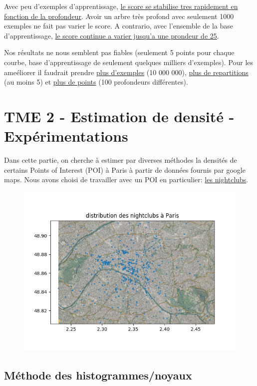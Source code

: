 \documentclass[a4paper]{article}
\begin{document}
Avec peu d'exemples d'apprentissage, \ul{le score se stabilise tres rapidement en fonction de la profondeur}. Avoir un arbre très profond avec seulement 1000 exemples ne fait pas varier le score. A contrario, avec l'ensemble de la base d'apprentissage, \ul{le score continue a varier jusqu'a une prondeur de 25}.

Nos résultats ne nous semblent pas fiables (seulement 5 points pour chaque courbe, base d'apprentissage de seulement quelques milliers d'exemples). Pour les ameéliorer il faudrait prendre \ul{plus d'exemples} (10 000 000), \ul{plus de repartitions} (au moins 5) et \ul{plus de points} (100 profondeurs différentes).



\section*{TME 2 - Estimation de densité - Expérimentations}

Dans cette partie, on cherche à estimer par diverses méthodes la densités de certains Points of Interest (POI) à Paris à partir de données fournis par google maps. Nous avons choisi de travailler avec un POI en particulier: \ul{les nightclubs}.

\begin{figure}[ht!]
\begin{center}
\includegraphics[scale=0.5]{nightclubs.png}
\label{apprentissage_prof2}
\end{center}
\end{figure}

\subsection*{Méthode des histogrammes/noyaux}
\end{document}
